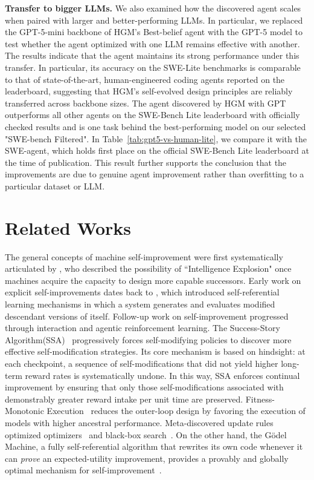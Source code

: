 \documentclass{article}
\begin{document}
\textbf{Transfer to bigger LLMs.} We also examined how the discovered agent scales when paired with larger and better-performing LLMs. In particular, we replaced the GPT-5-mini backbone of HGM's Best-belief agent with the GPT-5 model to test whether the agent optimized with one LLM remains effective with another. The results indicate that the agent maintains its strong performance under this transfer. In particular, its accuracy on the SWE-Lite benchmarks is comparable to that of state-of-the-art, human-engineered coding agents reported on the leaderboard, suggesting that HGM’s self-evolved design principles are reliably transferred across backbone sizes. The agent discovered by HGM with GPT outperforms all other agents on the SWE-Bench Lite leaderboard with officially checked results and is one task behind the best-performing model on our selected "SWE-bench Filtered". In Table~\ref{tab:gpt5-vs-human-lite}, we compare it with the SWE-agent, which holds first place on the official SWE-Bench Lite leaderboard at the time of publication. This result further supports the conclusion that the improvements are due to genuine agent improvement rather than overfitting to a particular dataset or LLM.


\section{Related Works}

The general concepts of machine self-improvement were first systematically articulated by \citet{good1966speculations}, who described the possibility of ``Intelligence Explosion" once machines acquire the capacity to design more capable successors. Early work on explicit self-improvements dates back to \citet{Schmidhuber1987EvolutionaryPI}, which introduced self-referential learning mechanisms in which a system generates and evaluates modified descendant versions of itself.
Follow-up work on self-improvement progressed through interaction and agentic reinforcement learning. 
The Success-Story Algorithm(SSA)~\citep{schmidhuber1996multi, schmidhuber1997shifting}  progressively forces self-modifying policies to discover more effective self-modification strategies. Its core mechanism is based on hindsight: at each checkpoint, a sequence of self-modifications that did not yield higher long-term reward rates is systematically undone. In this way, SSA enforces continual improvement by ensuring that only those self-modifications associated with demonstrably greater reward intake per unit time are preserved.
Fitness-Monotonic Execution~\citep{kirsch2022self,kirsch2022eliminating} reduces the outer-loop design by favoring the execution of models with higher ancestral performance. Meta-discovered update rules optimized optimizers~\citep{metz2021training} and black-box search~\citep{lange2023discovering}. 
On the other hand, the G\"odel Machine, a fully self-referential algorithm that rewrites its own code whenever it can \emph{prove} an expected-utility improvement, provides a provably and globally optimal mechanism for self-improvement~\citep{Schmidhuber:03gm}.
\end{document}
